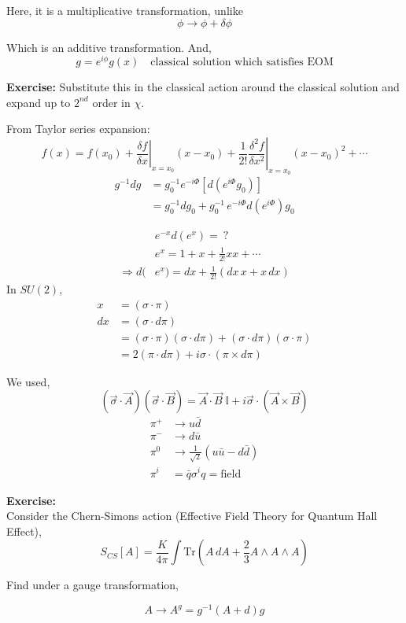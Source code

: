 \documentclass[14pt]{article} %
\begin{document}
Here, it is a multiplicative transformation, unlike
\[
\phi \to \phi + \delta \phi
\]

Which is an additive transformation. And,
\[
g = e^{i \phi} g(x)
\quad \text{classical solution which satisfies EOM}
\]
\begin{tcolorbox}
\textbf{Exercise:}
\noindent Substitute this in the classical action around the classical solution and expand up to $2^{nd}$ order in $\chi$.
\end{tcolorbox}

From Taylor series expansion:
\[
f(x) = f(x_0)
+ \left. \frac{\delta f}{\delta x} \right|_{x=x_0}
(x-x_0)
+ \frac{1}{2!}
\left. \frac{\delta^2 f}{\delta x^2} \right|_{x=x_0}
(x-x_0)^2 + \cdots
\]
\begin{align*}
g^{-1} dg
&=
g_0^{-1} e^{-i\Phi} \left[ d(e^{i\Phi} g_0) \right]
\\
&=
g_0^{-1}  dg_0
+
g_0^{-1} \, e^{-i\Phi} d(e^{i\Phi}) g_0
\end{align*}
\begin{tcolorbox}
\begin{align*}
& e^{-x} d(e^x) = ~?
\\
& e^x = 1 + x + \frac{1}{2!} x x + \cdots
\\
\Rightarrow d(& e^x) = dx + \frac{1}{2!} (dx\,x + x\,dx)
\end{align*}
In $SU(2)$,
\begin{align*}
x &= (\sigma \cdot \pi)
\\
dx &= (\sigma \cdot d\pi)
\\
&= (\sigma \cdot \pi)(\sigma \cdot d\pi)
+ (\sigma \cdot d\pi)(\sigma \cdot \pi)
\\
&= 2 (\pi \cdot d\pi)
+ i \sigma \cdot (\pi \times d\pi)
\end{align*}

We used,
\[
(\vec{\sigma} \cdot \vec{A})
(\vec{\sigma} \cdot \vec{B})
=
\vec{A} \cdot \vec{B} \; \mathbb{I}
+ i \vec{\sigma} \cdot (\vec{A} \times \vec{B}) 
\]
\begin{align*}
\pi^+ &\to u \bar d
\\
\pi^- &\to d \bar u
\\
\pi^0 &\to \frac{1}{\sqrt 2}( u \bar u - d \bar d)
\\
\pi^i &= \bar q \sigma^i q = \text{field}
\end{align*}
\end{tcolorbox}
\begin{tcolorbox}
\textbf{Exercise:}\\
\noindent Consider the Chern-Simons action (Effective Field Theory for Quantum Hall Effect),
\[
S_{CS}[A]
=
\frac{K}{4\pi}
\int
\text{Tr}
\left(
A \, dA + \frac{2}{3} A \wedge A \wedge A
\right)
\]

Find under a gauge transformation,

\[
A \to A^g = g^{-1} (A + d) g
\]
\end{tcolorbox}
\end{document}

